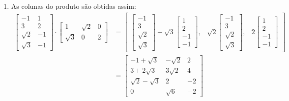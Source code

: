 \documentclass[12pt,a4paper]{article}
\begin{document}
\begin{enumerate}
\begin{enumerate}
\item As colunas do produto são obtidas assim:
\begin{align*}
\begin{bmatrix}
       -1 & 1 \\
        3 & 2 \\
 \sqrt{2} & -1 \\
 \sqrt{3} & -1 
\end{bmatrix}
\cdot
\begin{bmatrix}
        1 & \sqrt{2} & 0\\
 \sqrt{3} &        0 & 2
\end{bmatrix}
& =
\begin{bmatrix}
\begin{bmatrix}
       -1 \\
        3 \\
 \sqrt{2} \\
 \sqrt{3} 
\end{bmatrix}
+\sqrt{3}
\begin{bmatrix}
1 \\
2 \\
-1 \\
-1
\end{bmatrix},
&
\sqrt{2}
\begin{bmatrix}
       -1 \\
        3 \\
 \sqrt{2} \\
 \sqrt{3} 
\end{bmatrix},
&
2
\begin{bmatrix}
1 \\
2 \\
-1 \\
-1
\end{bmatrix}
\end{bmatrix} \\
& =
\begin{bmatrix}
-1 + \sqrt{3} & -\sqrt{2} & 2 \\
3 + 2\sqrt{3} & 3\sqrt{2} & 4 \\
\sqrt{2} - \sqrt{3} & 2 & -2 \\
0 & \sqrt{6} & -2
\end{bmatrix}
\end{align*}


\end{enumerate}
\end{enumerate}
\end{document}
